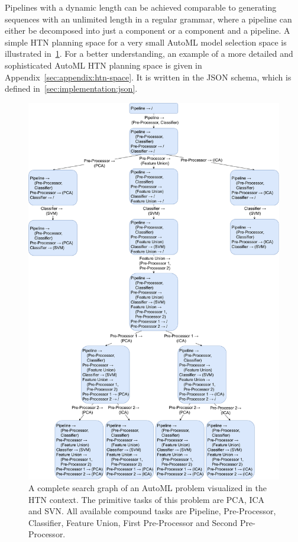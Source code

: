 Pipelines with a dynamic length can be achieved comparable to generating sequences with an unlimited length in a regular grammar, where a pipeline can either be decomposed into just a component or a component and a pipeline.
A simple HTN planning space for a very small AutoML model selection space is illustrated in~\ref{fig:appraoch:htn-automl}.
For a better understanding, an example of a more detailed and sophisticated AutoML HTN planning space is given in Appendix~\ref{sec:appendix:htn-space}.
It is written in the JSON schema, which is defined in~\ref{sec:implementation:json}.
\begin{figure}[ht!]
    \centering
    \includegraphics[width=\textwidth]{gfx/Figures/Approach/HTNAutoML.pdf}
    \caption[A complete search graph of an AutoML problem visualized in the HTN context.]{A complete search graph of an AutoML problem visualized in the HTN context. The primitive tasks of this problem are PCA, ICA and SVN.
    All available compound tasks are Pipeline, Pre-Processor, Classifier, Feature Union, First Pre-Processor and Second Pre-Processor.}
    \label{fig:appraoch:htn-automl}
\end{figure}

